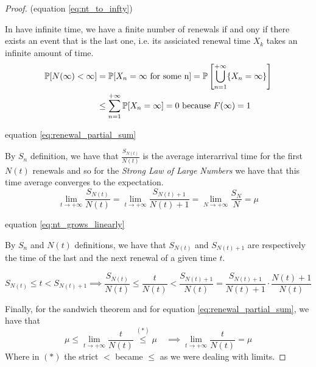 \begin{proof}
	\proofpart (equation \eqref{eq:nt_to_infty})

	In have infinite time, we have a finite number of renewals if and ony if there exists an event that is the last one, i.e. its assiciated renewal time $X_k$ takes an infinite amount of time.
	\begin{equation*}
		\begin{split}
			\mathbb{P}[N(\infty)<\infty] &= \mathbb{P}[X_n = \infty \text{ for some n}] = \mathbb{P} \left[ \bigcup\limits_{n=1}^{+\infty}\{X_n = \infty \} \right] \\
			&\le \sum\limits_{n=1}^{+\infty}\mathbb{P}[X_n = \infty] = 0 \text{~because~} F(\infty)=1
		\end{split}
	\end{equation*}

	\proofpart equation \eqref{eq:renewal_partial_sum}

	By $S_n$ definition, we have that $ \frac{S_{N(t)}}{N(t)}$ is the average interarrival time for the first $N(t)$ renewals and so for the \emph{Strong Law of Large Numbers} we have that this time average converges to the expectation.
	$$ \lim_{t \to +\infty} \frac{S_{N(t)}}{N(t)} = \lim_{t \to +\infty} \frac{S_{N(t)+1}}{N(t)+1} = \lim_{N \to +\infty} \frac{S_{N}}{N} = \mu $$

	\proofpart equation \eqref{eq:nt_grows_linearly}

	By $S_n$ and $N(t)$ definitions, we have that $S_{N(t)}$ and $S_{N(t)+1}$ are respectively the time of the last and the next renewal of a given time $t$.

	\begin{equation*}
			S_{N(t)} \le t < S_{N(t)+1} \implies
			\frac{S_{N(t)}}{N(t)} \le \frac{t}{N(t)} < \frac{S_{N(t)+1}}{N(t)} =\frac{S_{N(t)+1}}{N(t)+1} \cdot \frac{N(t)+1}{N(t)}
	\end{equation*}

	Finally, for the sandwich theorem and for equation \eqref{eq:renewal_partial_sum}, we have that
	$$ \mu \le \lim_{t \to +\infty} \frac{t}{N(t)} \stackrel{(*)}{\le}\mu \quad \implies \lim_{t \to +\infty} \frac{t}{N(t)} = \mu $$
	Where in $(*)$ the strict $<$ became $\le$ as we were dealing with limits.
\end{proof}


